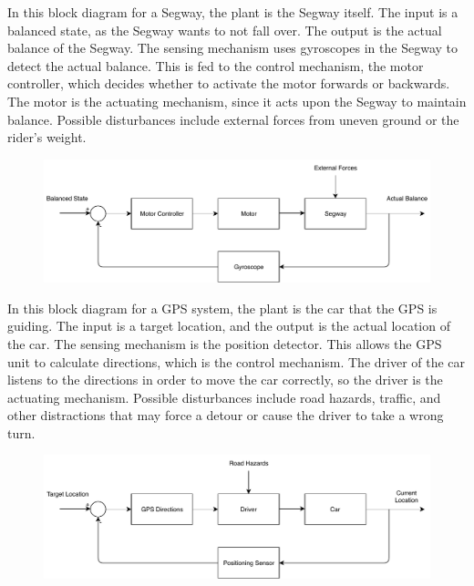 \documentclass[12pt]{article}
\begin{document}
In this block diagram for a Segway, the plant is the Segway itself. The input is a balanced state, as the Segway
wants to not fall over. The output is the actual balance of the Segway. The sensing mechanism uses gyroscopes in
the Segway to detect the actual balance. This is fed to the control mechanism, the motor controller, which decides
whether to activate the motor forwards or backwards. The motor is the actuating mechanism, since it acts upon the
Segway to maintain balance. Possible disturbances include external forces from uneven ground or the rider's weight.
\begin{figure}[H]
    \begin{center}
        \includegraphics[width=5.3in]{Segway.pdf}
    \end{center}
\end{figure}

In this block diagram for a GPS system, the plant is the car that the GPS is guiding. The input is a target location,
and the output is the actual location of the car. The sensing mechanism is the position detector. This allows the GPS
unit to calculate directions, which is the control mechanism. The driver of the car listens to the directions in order
to move the car correctly, so the driver is the actuating mechanism. Possible disturbances include road hazards, traffic,
and other distractions that may force a detour or cause the driver to take a wrong turn.
\begin{figure}[H]
    \begin{center}
        \includegraphics[width=5.3in]{GPS.pdf}
    \end{center}
\end{figure}
\end{document}
